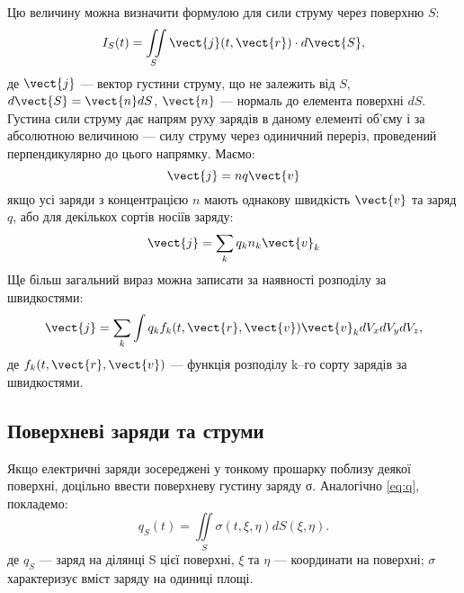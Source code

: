 Цю величину можна визначити формулою для сили
струму через поверхню $S$:
\begin{equation}
    I_S(t) = \iint\limits_S \vect{j}(t, \vect{r})\cdot d\vect{S},
\end{equation}
де $\vect{j}$ --- вектор густини струму, що не залежить від $S$, $d\vect{S} = \vect{n} dS$, $\vect{n}$ --- нормаль до
елемента поверхні $dS$. Густина сили струму дає напрям руху зарядів в даному
елементі об’єму і за абсолютною величиною --- силу струму через одиничний
переріз, проведений перпендикулярно до цього напрямку. Маємо:
\begin{equation}
    \vect{j} = nq\vect{v}
\end{equation}
якщо усі заряди з концентрацією $n$ мають однакову швидкість $\vect{v}$ та заряд $q$,
або для декількох сортів носіїв заряду:
\begin{equation}
\vect{j} = \sum\limits_k q_k n_k\vect{v}_k
\end{equation}
Ще більш загальний вираз можна записати за наявності розподілу за
швидкостями:
\begin{equation}
\vect{j} = \sum\limits_k \int  q_k f_k(t, \vect{r}, \vect{v}) \vect{v}_k dV_xdV_ydV_z,
\end{equation}
де $f_k(t, \vect{r}, \vect{v})$ --- функція розподілу k–го сорту зарядів за швидкостями.


\subsection*{Поверхневі заряди та струми}


 Якщо електричні заряди зосереджені у
тонкому прошарку поблизу деякої поверхні, доцільно ввести поверхневу
густину заряду σ. Аналогічно \eqref{eq:q}, покладемо:
\begin{equation}
    q_S(t) = \iint\limits_S \sigma(t, \xi, \eta) dS(\xi, \eta).
\end{equation}
де $q_S$ --- заряд на ділянці S цієї поверхні, $\xi$ та $\eta$ --- координати на поверхні; $\sigma$
характеризує вміст заряду на одиниці площі.


\begin{SCfigure}[2][h!]
    \centering
\caption{}
\label{surface_current}
\end{SCfigure}

